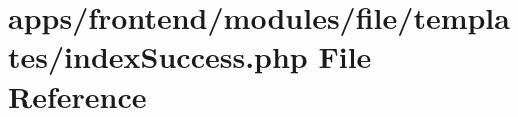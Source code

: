\hypertarget{frontend_2modules_2file_2templates_2index_success_8php}{\section{apps/frontend/modules/file/templates/index\-Success.php File Reference}
\label{frontend_2modules_2file_2templates_2index_success_8php}
}
